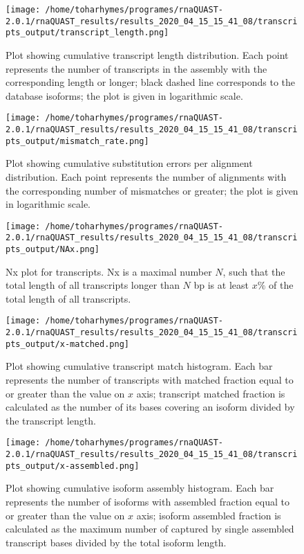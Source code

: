 \documentclass[12pt,a4paper]{article}
\begin{document}
\FloatBarrier\clearpage{}
\begin{figure}[t]\centering\texttt{[image: /home/toharhymes/programes/rnaQUAST-2.0.1/rnaQUAST\_results/results\_2020\_04\_15\_15\_41\_08/transcripts\_output/transcript\_length.png]}\caption{Plot showing cumulative transcript length distribution. Each point represents the number of transcripts in the assembly with the corresponding length or longer; black dashed line corresponds to the database isoforms; the plot is given in logarithmic scale.}\end{figure}\FloatBarrier\clearpage
\begin{figure}[t]\centering\texttt{[image: /home/toharhymes/programes/rnaQUAST-2.0.1/rnaQUAST\_results/results\_2020\_04\_15\_15\_41\_08/transcripts\_output/mismatch\_rate.png]}\caption{Plot showing cumulative substitution errors per alignment distribution. Each point represents the number of alignments with the corresponding number of mismatches or greater; the plot is given in logarithmic scale.}\end{figure}\FloatBarrier\clearpage
\begin{figure}[t]\centering\texttt{[image: /home/toharhymes/programes/rnaQUAST-2.0.1/rnaQUAST\_results/results\_2020\_04\_15\_15\_41\_08/transcripts\_output/NAx.png]}\caption{Nx plot for transcripts. Nx is a maximal number $N$, such that the total length of all transcripts longer than $N$ bp is at least $x\%$ of the total length of all transcripts.}\end{figure}\FloatBarrier\clearpage
\begin{figure}[t]\centering\texttt{[image: /home/toharhymes/programes/rnaQUAST-2.0.1/rnaQUAST\_results/results\_2020\_04\_15\_15\_41\_08/transcripts\_output/x-matched.png]}\caption{Plot showing cumulative transcript match histogram. Each bar represents the number of transcripts with matched fraction equal to or greater than the value on $x$ axis; transcript matched fraction is calculated as the number of its bases covering an isoform divided by the transcript length.}\end{figure}\FloatBarrier\clearpage
\begin{figure}[t]\centering\texttt{[image: /home/toharhymes/programes/rnaQUAST-2.0.1/rnaQUAST\_results/results\_2020\_04\_15\_15\_41\_08/transcripts\_output/x-assembled.png]}\caption{Plot showing cumulative isoform assembly histogram. Each bar represents the number of isoforms with assembled fraction equal to or greater than the value on $x$ axis; isoform assembled fraction is calculated as the maximum number of captured by single assembled transcript bases divided by the total isoform length.}\end{figure}\FloatBarrier\clearpage
\end{document}
